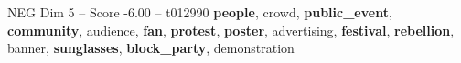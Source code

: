 \begin{textsample}{NEG Dim 5 – Score -6.00 – t012990}  \label{ex:f5_neg_025}
\textbf{people}, crowd, \textbf{public\_event}, \textbf{community}, audience, \textbf{fan}, \textbf{protest}, \textbf{poster}, advertising, \textbf{festival}, \textbf{rebellion}, banner, \textbf{sunglasses}, \textbf{block\_party}, demonstration

\end{textsample}
